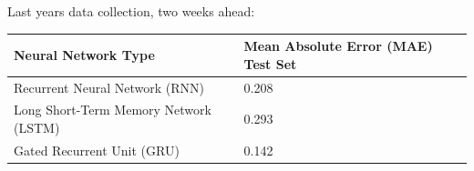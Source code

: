 \documentclass[aspectratio=169]{beamer}
\begin{document}
  \begin{frame}
    Last years data collection, two weeks ahead:
    \begin{table}[]
      \begin{tabular}{l|l}
      Neural Network Type                   & Mean Absolute Error (MAE) Test Set \\ \hline
      Recurrent Neural Network (RNN)        & 0.208                              \\
      Long Short-Term Memory Network (LSTM) & 0.293                              \\
      Gated Recurrent Unit (GRU)            & 0.142
      \end{tabular}
    \end{table}
  \end{frame}

\end{document}
